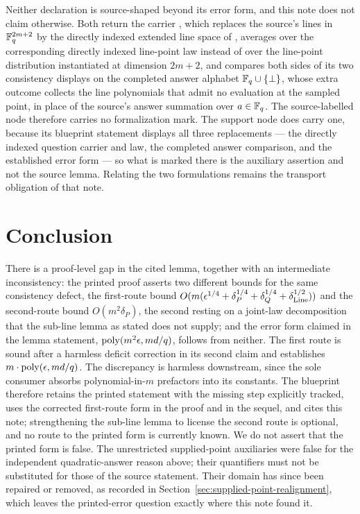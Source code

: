 \documentclass[11pt]{article}
\DeclareMathOperator{\poly}{poly}
\begin{document}
Neither declaration is source-shaped beyond its error form, and this note does
not claim otherwise.  Both return the carrier ,
which replaces the source's lines in $\mathbb{F}_q^{2m+2}$ by the directly indexed
extended line space of
, averages over the
corresponding directly indexed line-point law instead of over the line-point
distribution instantiated at dimension $2m+2$, and compares both sides of its
two consistency displays on the completed answer alphabet
$\mathbb{F}_q\cup\{\bot\}$, whose extra outcome collects the line polynomials that
admit no evaluation at the sampled point, in place of the source's answer
summation over $a\in\mathbb{F}_q$.  The source-labelled node 
therefore carries no formalization mark.  The support node
 does carry one, because its blueprint statement
displays all three replacements --- the directly indexed question carrier and
law, the completed answer comparison, and the established error form --- so what
is marked there is the auxiliary assertion and not the source lemma.  Relating
the two formulations remains the transport obligation of that note.

\section{Conclusion}

There is a proof-level gap in the cited lemma, together with an
intermediate inconsistency: the printed proof asserts two different
bounds for the same consistency defect, the first-route bound
$O(m(\epsilon^{1/4} + \delta_P^{1/4} + \delta_Q^{1/4} +
\delta_{\mathrm{Line}}^{1/2}))$ and the second-route bound
$O(m^2\delta_P)$, the second resting on a joint-law decomposition that
the sub-line lemma as stated does not supply; and the error form claimed
in the lemma statement, $\poly(m^2\eps, md/q)$, follows from neither.
The first route is sound after a harmless deficit correction in its
second claim and establishes $m \cdot \poly(\eps, md/q)$.  The
discrepancy is harmless downstream, since the sole consumer absorbs
polynomial-in-$m$ prefactors into its constants.  The blueprint therefore
retains the printed statement with the missing step explicitly tracked, uses
the corrected first-route form in the proof and in the sequel, and cites this
note; strengthening the sub-line lemma to license the second route is
optional, and no route to the printed form is currently known.  We do not
assert that the printed form is false.
The unrestricted supplied-point auxiliaries were false for the independent
quadratic-answer reason above; their quantifiers must not be substituted for
those of the source statement.  Their domain has since been repaired or
removed, as recorded in Section~\ref{sec:supplied-point-realignment}, which
leaves the printed-error question exactly where this note found it.



\end{document}
